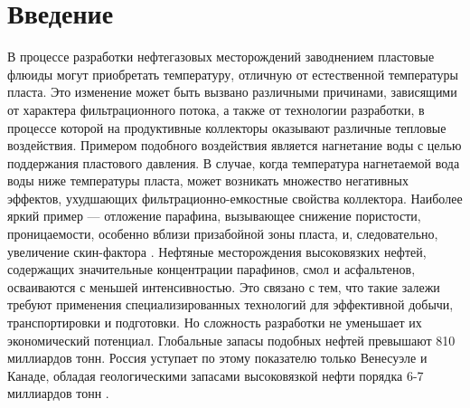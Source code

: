 \documentclass[12pt,twoside,a4paper]{uz_ku}
\begin{document}
\section*{Введение}

	В процессе разработки нефтегазовых месторождений заводнением пластовые флюиды могут приобретать температуру, отличную от естественной температуры пласта. Это изменение может быть вызвано различными причинами, зависящими от характера фильтрационного потока, а также от технологии разработки, в процессе которой на продуктивные коллекторы оказывают различные тепловые воздействия. Примером подобного воздействия является нагнетание воды с целью поддержания пластового давления. В случае, когда температура нагнетаемой вода воды ниже температуры пласта, может возникать множество негативных эффектов, ухудшающих фильтрационно-емкостные свойства коллектора. Наиболее яркий пример — отложение парафина, вызывающее снижение пористости, проницаемости, особенно вблизи призабойной зоны пласта, и, следовательно, увеличение скин-фактора \cite{1}.
	Нефтяные месторождения высоковязких нефтей, содержащих значительные концентрации парафинов, смол и асфальтенов, осваиваются с меньшей интенсивностью. Это связано с тем, что такие залежи требуют применения специализированных технологий для эффективной добычи, транспортировки и подготовки. Но сложность разработки не уменьшает их экономический потенциал. Глобальные запасы подобных нефтей превышают 810 миллиардов тонн. Россия уступает по этому показателю только Венесуэле и Канаде, обладая геологическими запасами высоковязкой нефти порядка 6-7 миллиардов тонн \cite{1}.
\end{document}
